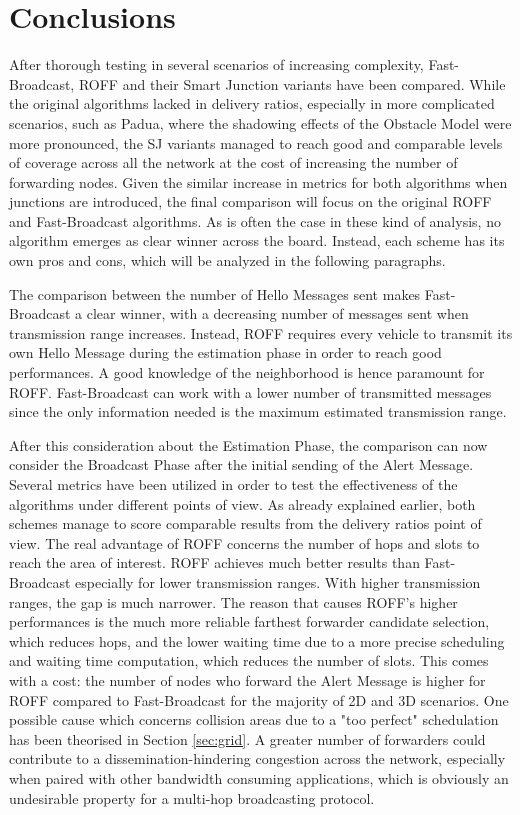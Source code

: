 

\chapter{Conclusions}
		\label{sec:comparison}
	After thorough testing in several scenarios of increasing complexity, Fast-Broadcast, ROFF and their Smart Junction variants have been compared. While the original algorithms lacked in delivery ratios, especially in more complicated scenarios, such as Padua, where the shadowing effects of the Obstacle Model were more pronounced, the SJ variants managed to reach good and comparable levels of coverage across all the network at the cost of increasing the number of forwarding nodes. Given the similar increase in metrics for both algorithms when junctions are introduced, the final comparison will focus on the original ROFF and Fast-Broadcast algorithms. As is often the case in these kind of analysis, no algorithm emerges as clear winner across the board. Instead, each scheme has its own pros and cons, which will be analyzed in the following paragraphs.
	
	
	The comparison between the number of Hello Messages sent makes Fast-Broadcast a clear winner, with a decreasing number of messages sent when transmission range increases. Instead, ROFF requires every vehicle to transmit its own Hello Message during the estimation phase in order to reach good performances. A good knowledge of the neighborhood is hence paramount for ROFF. Fast-Broadcast can work with a lower number of transmitted messages since the only information needed is the maximum estimated transmission range. 
	
	
	After this consideration about the Estimation Phase, the comparison can now consider the Broadcast Phase after the initial sending of the Alert Message. Several metrics have been utilized in order to test the effectiveness of the algorithms under different points of view. As already explained earlier, both schemes manage to score comparable results from the delivery ratios point of view. The real advantage of ROFF concerns the number of hops and slots to reach the area of interest. ROFF achieves much better results than Fast-Broadcast especially for lower transmission ranges. With higher transmission ranges, the gap is much narrower. The reason that causes ROFF's higher performances is the much more reliable farthest forwarder candidate selection, which reduces hops, and the lower waiting time due to a more precise scheduling and waiting time computation, which reduces the number of slots. This comes with a cost: the number of nodes who forward the Alert Message is higher for ROFF compared to Fast-Broadcast for the majority of 2D and 3D scenarios. One possible cause which concerns collision areas due to a "too perfect" schedulation has been theorised in Section \ref{sec:grid}. A greater number of forwarders could contribute to a dissemination-hindering congestion across the network, especially when paired with other bandwidth consuming applications, which is obviously an undesirable property for a multi-hop broadcasting protocol.
	
